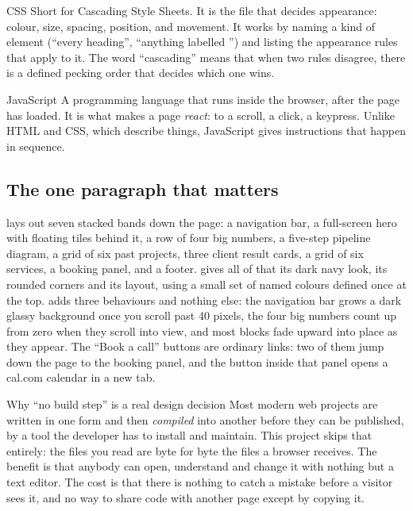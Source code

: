 \documentclass[11pt,a4paper]{article}
\begin{document}
\begin{jargon}{CSS}
Short for Cascading Style Sheets. It is the file that decides appearance: colour,
size, spacing, position, and movement. It works by naming a kind of element (``every
heading'', ``anything labelled '') and listing the appearance rules that
apply to it. The word ``cascading'' means that when two rules disagree, there is a
defined pecking order that decides which one wins.
\end{jargon}

\begin{jargon}{JavaScript}
A programming language that runs inside the browser, after the page has loaded.
It is what makes a page \emph{react}: to a scroll, a click, a keypress. Unlike
HTML and CSS, which describe things, JavaScript gives instructions that happen in
sequence.
\end{jargon}

\subsection{The one paragraph that matters}

 lays out seven stacked bands down the page: a navigation bar, a
full-screen hero with floating tiles behind it, a row of four big numbers, a
five-step pipeline diagram, a grid of six past projects, three client result
cards, a grid of six services, a booking panel, and a footer. 
gives all of that its dark navy look, its rounded corners and its layout, using a
small set of named colours defined once at the top.  adds three
behaviours and nothing else: the navigation bar grows a dark glassy background
once you scroll past 40 pixels, the four big numbers count up from zero when they
scroll into view, and most blocks fade upward into place as they appear. The
``Book a call'' buttons are ordinary links: two of them jump down the page to the
booking panel, and the button inside that panel opens a cal.com calendar in a new
tab.

\begin{keyidea}{Why ``no build step'' is a real design decision}
Most modern web projects are written in one form and then \emph{compiled} into
another before they can be published, by a tool the developer has to install and
maintain. This project skips that entirely: the files you read are byte for byte
the files a browser receives. The benefit is that anybody can open, understand
and change it with nothing but a text editor. The cost is that there is nothing
to catch a mistake before a visitor sees it, and no way to share code with
another page except by copying it.
\end{keyidea}
\end{document}
